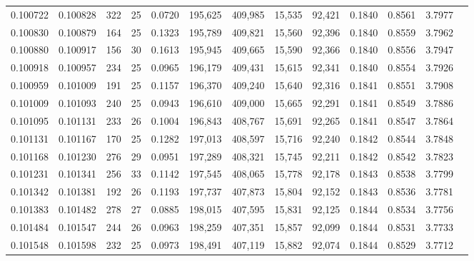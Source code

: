 \begin{tabular}{rrrrrrrrrrrrr}
0.100722 & 0.100828 & 322 &  25 &                                     0.0720 & 195,625 & 409,985 &  15,535 &  92,421 & 0.1840 & 0.8561 & 3.7977 \\
0.100830 & 0.100879 & 164 &  25 &                                     0.1323 & 195,789 & 409,821 &  15,560 &  92,396 & 0.1840 & 0.8559 & 3.7962 \\
0.100880 & 0.100917 & 156 &  30 &                                     0.1613 & 195,945 & 409,665 &  15,590 &  92,366 & 0.1840 & 0.8556 & 3.7947 \\
0.100918 & 0.100957 & 234 &  25 &                                     0.0965 & 196,179 & 409,431 &  15,615 &  92,341 & 0.1840 & 0.8554 & 3.7926 \\
0.100959 & 0.101009 & 191 &  25 &                                     0.1157 & 196,370 & 409,240 &  15,640 &  92,316 & 0.1841 & 0.8551 & 3.7908 \\
0.101009 & 0.101093 & 240 &  25 &                                     0.0943 & 196,610 & 409,000 &  15,665 &  92,291 & 0.1841 & 0.8549 & 3.7886 \\
0.101095 & 0.101131 & 233 &  26 &                                     0.1004 & 196,843 & 408,767 &  15,691 &  92,265 & 0.1841 & 0.8547 & 3.7864 \\
0.101131 & 0.101167 & 170 &  25 &                                     0.1282 & 197,013 & 408,597 &  15,716 &  92,240 & 0.1842 & 0.8544 & 3.7848 \\
0.101168 & 0.101230 & 276 &  29 &                                     0.0951 & 197,289 & 408,321 &  15,745 &  92,211 & 0.1842 & 0.8542 & 3.7823 \\
0.101231 & 0.101341 & 256 &  33 &                                     0.1142 & 197,545 & 408,065 &  15,778 &  92,178 & 0.1843 & 0.8538 & 3.7799 \\
0.101342 & 0.101381 & 192 &  26 &                                     0.1193 & 197,737 & 407,873 &  15,804 &  92,152 & 0.1843 & 0.8536 & 3.7781 \\
0.101383 & 0.101482 & 278 &  27 &                                     0.0885 & 198,015 & 407,595 &  15,831 &  92,125 & 0.1844 & 0.8534 & 3.7756 \\
0.101484 & 0.101547 & 244 &  26 &                                     0.0963 & 198,259 & 407,351 &  15,857 &  92,099 & 0.1844 & 0.8531 & 3.7733 \\
0.101548 & 0.101598 & 232 &  25 &                                     0.0973 & 198,491 & 407,119 &  15,882 &  92,074 & 0.1844 & 0.8529 & 3.7712 \\

\end{tabular}
